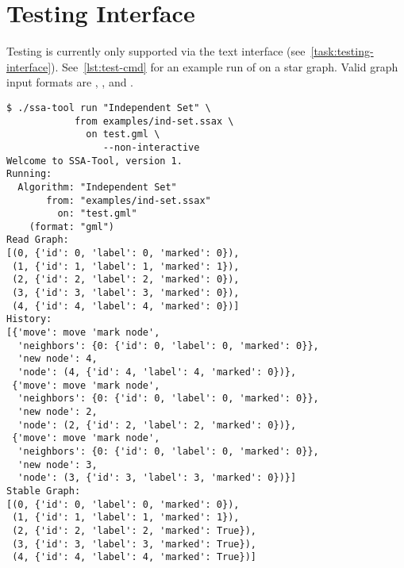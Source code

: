 \section{Testing Interface}
\label{sec:interface-testing}

Testing is currently only supported via the text interface (see~\autoref{task:testing-interface}).
See~\autoref{lst:test-cmd} for an example run of  on a star graph.
Valid graph input formats are , , and .

\begin{lstlisting}[language={},float=!ht,caption={A model testing session using the command-line utility.},label={lst:test-cmd}]
$ ./ssa-tool run "Independent Set" \
            from examples/ind-set.ssax \
              on test.gml \
                 --non-interactive
Welcome to SSA-Tool, version 1.
Running:
  Algorithm: "Independent Set"
       from: "examples/ind-set.ssax"
         on: "test.gml"
    (format: "gml")
Read Graph:
[(0, {'id': 0, 'label': 0, 'marked': 0}),
 (1, {'id': 1, 'label': 1, 'marked': 1}),
 (2, {'id': 2, 'label': 2, 'marked': 0}),
 (3, {'id': 3, 'label': 3, 'marked': 0}),
 (4, {'id': 4, 'label': 4, 'marked': 0})]
History:
[{'move': move 'mark node',
  'neighbors': {0: {'id': 0, 'label': 0, 'marked': 0}},
  'new node': 4,
  'node': (4, {'id': 4, 'label': 4, 'marked': 0})},
 {'move': move 'mark node',
  'neighbors': {0: {'id': 0, 'label': 0, 'marked': 0}},
  'new node': 2,
  'node': (2, {'id': 2, 'label': 2, 'marked': 0})},
 {'move': move 'mark node',
  'neighbors': {0: {'id': 0, 'label': 0, 'marked': 0}},
  'new node': 3,
  'node': (3, {'id': 3, 'label': 3, 'marked': 0})}]
Stable Graph:
[(0, {'id': 0, 'label': 0, 'marked': 0}),
 (1, {'id': 1, 'label': 1, 'marked': 1}),
 (2, {'id': 2, 'label': 2, 'marked': True}),
 (3, {'id': 3, 'label': 3, 'marked': True}),
 (4, {'id': 4, 'label': 4, 'marked': True})]
\end{lstlisting}

